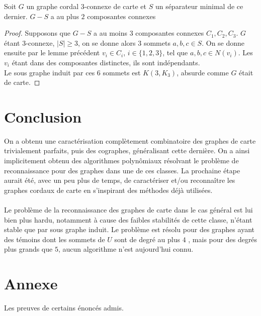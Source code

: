 \documentclass{scrartcl}
\begin{document}
\begin{flushleft}
\begin{cor}
    Soit $G$ un graphe cordal $3$-connexe de carte et $S$ un séparateur minimal de ce dernier. $G - S$ a au plus $2$ composantes
    connexes
\end{cor}

\begin{proof}
    Supposons que $G - S$ a au moins $3$ composantes connexes $C_1, C_2, C_3$. $G$ étant $3$-connexe, $|S| \geq 3$, on se donne
    alors $3$ sommets $a,b,c \in S$. On se donne ensuite par le lemme précédent $v_i \in C_i$, $i \in \{1,2,3\}$, tel que
    $a,b,c \in N(v_i)$. Les $v_i$ étant dans des composantes distinctes, ils sont indépendants.\\
    Le sous graphe induit par ces $6$ sommets est $K(3, K_3)$, absurde comme $G$ était de carte.
\end{proof}

\section*{Conclusion}

On a obtenu une caractérisation complètement combinatoire des graphes de carte trivialement parfaits, puis des cographes,
généralisant cette dernière. On a ainsi implicitement obtenu des algorithmes polynômiaux résolvant le problème de reconnaissance
pour des graphes dans une de ces classes. La prochaine étape aurait été, avec un peu plus de temps, de caractériser et/ou
reconnaître les graphes cordaux de carte en s'inspirant des méthodes déjà utilisées.
\\~\\
Le problème de la reconnaissance des graphes de carte dans le cas général est lui bien plus hardu, notamment à cause des faibles
stabilités de cette classe, n'étant stable que par sous graphe induit. Le problème est résolu pour des graphes ayant des témoins dont
les sommets de $U$ sont de degré au plus $4$ \cite{IntroMap},
mais pour des degrés plus grands que $5$, aucun algorithme n'est aujourd'hui connu.




\newpage

\section*{Annexe}

Les preuves de certains énoncés admis.


\end{flushleft}
\end{document}
